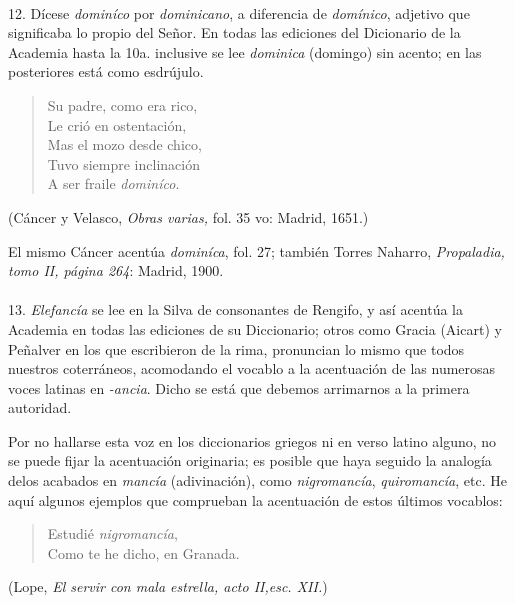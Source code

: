 \documentclass{article}
\begin{document}
\normalsize

\paragraph{} 12. Dícese \emph{dominíco} por \emph{dominicano}, a diferencia de \emph{domínico}, adjetivo que 
significaba lo propio del Señor. En todas las ediciones del Dicionario de la Academia hasta la 10a. inclusive
se lee \emph{dominica} (domingo) sin acento; en las posteriores está como esdrújulo.

\small

\begin{verse}
Su padre, como era rico, \\
Le crió en ostentación, \\
Mas el mozo desde chico, \\
Tuvo siempre inclinación \\
A ser fraile \emph{dominíco}.
\end{verse}
\begin{flushright}
(Cáncer y Velasco, \emph{Obras varias,} fol. 35 vo: Madrid, 1651.)
\end{flushright}

El mismo Cáncer acentúa \emph{dominíca}, fol. 27; también Torres Naharro, \emph{Propaladia, tomo II, página 264}:
Madrid, 1900.

\normalsize

\paragraph{} 13. \emph{Elefancía} se lee en la Silva de consonantes de Rengifo, y así acentúa la Academia en todas
las ediciones de su Diccionario; otros como Gracia (Aicart) y Peñalver en los que escribieron de la rima, 
pronuncian lo mismo que todos nuestros coterráneos, acomodando el vocablo a la acentuación de las numerosas
voces latinas en \emph{-ancia}. Dicho se está que debemos arrimarnos a la primera autoridad.

\small

Por no hallarse esta voz en los diccionarios griegos ni en verso latino alguno, no se puede fijar la acentuación
originaria; es posible que haya seguido la analogía delos acabados en \emph{mancía} (adivinación), como 
\emph{nigromancía}, \emph{quiromancía}, etc. He aquí algunos ejemplos que comprueban la acentuación de estos
últimos vocablos:

\begin{verse}
Estudié \emph{nigromancía}, \\
Como te he dicho, en Granada.
\end{verse}
\begin{flushright}
(Lope, \emph{El servir con mala estrella, acto II,esc. XII.})
\end{flushright}
\end{document}
